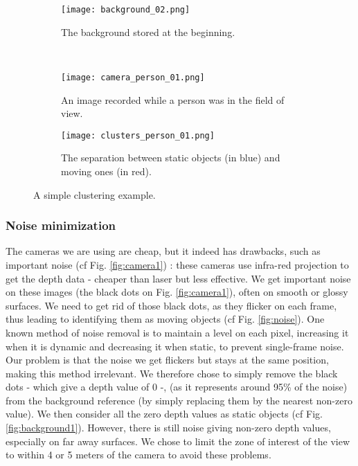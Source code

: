 \documentclass[smallextended]{svjour3}
\begin{document}
\begin{figure*}[t!]
\centering

  \begin{subfigure}[t]{0.5\textwidth}
  \centering
  \texttt{[image: background\_02.png]}
  \caption{\label{fig:background2}The background stored at the beginning.}
  \end{subfigure}%
  ~
  \begin{subfigure}[t]{0.5\textwidth}
  \centering
  \texttt{[image: camera\_person\_01.png]}
  \caption{\label{fig:cameraperson1}An image recorded while a person was in the field of view.}
  \end{subfigure}

  \begin{subfigure}{0.5\textwidth}
  \centering
  \texttt{[image: clusters\_person\_01.png]}
  \caption{\label{fig:clustersperson1}The separation between static objects (in blue) and moving ones (in red).}
  \end{subfigure}
  \caption{A simple clustering example.}

\end{figure*}

\subsubsection{Noise minimization}

The cameras we are using are cheap, but it indeed has drawbacks, such as important noise (cf Fig. \ref{fig:camera1}) : these cameras use infra-red projection to get the depth data - cheaper than laser but less effective. We get important noise on these images (the black dots on Fig. \ref{fig:camera1}), often on smooth or glossy surfaces.
We need to get rid of those black dots, as they flicker on each frame, thus leading to identifying them as moving objects (cf Fig. \ref{fig:noise}). One known method of noise removal is to maintain a level on each pixel, increasing it when it is dynamic and decreasing it when static, to prevent single-frame noise. Our problem is that the noise we get flickers but stays at the same position, making this method irrelevant.
We therefore chose to simply remove the black dots - which give a depth value of 0 -, (as it represents around 95\% of the noise) from the background reference (by simply replacing them by the nearest non-zero value). We then consider all the zero depth values as static objects (cf Fig. \ref{fig:background1}).
However, there is still noise giving non-zero depth values, especially on far away surfaces. We chose to limit the zone of interest of the view to within 4 or 5 meters of the camera to avoid these problems.
\end{document}
